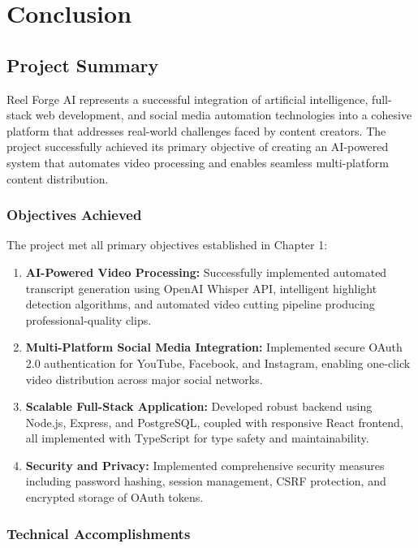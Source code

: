 \chapter{Conclusion}

\section{Project Summary}

Reel Forge AI represents a successful integration of artificial intelligence, full-stack web development, and social media automation technologies into a cohesive platform that addresses real-world challenges faced by content creators. The project successfully achieved its primary objective of creating an AI-powered system that automates video processing and enables seamless multi-platform content distribution.

\subsection{Objectives Achieved}

The project met all primary objectives established in Chapter 1:

\begin{enumerate}
    \item \textbf{AI-Powered Video Processing:} Successfully implemented automated transcript generation using OpenAI Whisper API, intelligent highlight detection algorithms, and automated video cutting pipeline producing professional-quality clips.
    
    \item \textbf{Multi-Platform Social Media Integration:} Implemented secure OAuth 2.0 authentication for YouTube, Facebook, and Instagram, enabling one-click video distribution across major social networks.
    
    \item \textbf{Scalable Full-Stack Application:} Developed robust backend using Node.js, Express, and PostgreSQL, coupled with responsive React frontend, all implemented with TypeScript for type safety and maintainability.
    
    \item \textbf{Security and Privacy:} Implemented comprehensive security measures including password hashing, session management, CSRF protection, and encrypted storage of OAuth tokens.
\end{enumerate}

\subsection{Technical Accomplishments}

